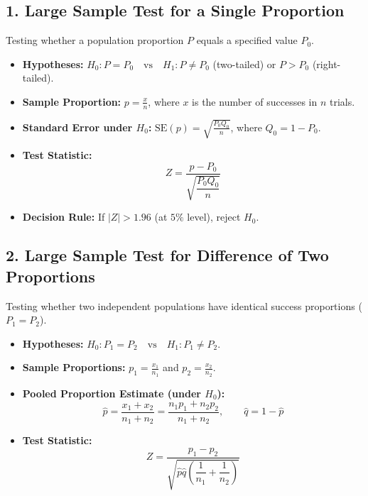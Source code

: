\documentclass[12pt,a4paper]{article}
\begin{document}
\subsection{1. Large Sample Test for a Single Proportion}
Testing whether a population proportion $P$ equals a specified value $P_0$.
\begin{tcolorbox}[formulabox, title={\textbf{Test for Single Proportion}}]
\begin{itemize}[leftmargin=*, itemsep=2pt]
  \item \textbf{Hypotheses:} $H_0: P = P_0 \quad \text{vs} \quad H_1: P \ne P_0$ (two-tailed) or $P > P_0$ (right-tailed).
  \item \textbf{Sample Proportion:} $p = \frac{x}{n}$, where $x$ is the number of successes in $n$ trials.
  \item \textbf{Standard Error under $H_0$:} $\text{SE}(p) = \sqrt{\frac{P_0 Q_0}{n}}$, where $Q_0 = 1 - P_0$.
  \item \textbf{Test Statistic:}
  \begin{equation}
    Z = \frac{p - P_0}{\sqrt{\dfrac{P_0 Q_0}{n}}}
  \end{equation}
  \item \textbf{Decision Rule:} If $|Z| > 1.96$ (at $5\%$ level), reject $H_0$.
\end{itemize}
\end{tcolorbox}

\subsection{2. Large Sample Test for Difference of Two Proportions}
Testing whether two independent populations have identical success proportions ($P_1 = P_2$).
\begin{tcolorbox}[formulabox, title={\textbf{Test for Difference of Two Proportions}}]
\begin{itemize}[leftmargin=*, itemsep=2pt]
  \item \textbf{Hypotheses:} $H_0: P_1 = P_2 \quad \text{vs} \quad H_1: P_1 \ne P_2$.
  \item \textbf{Sample Proportions:} $p_1 = \frac{x_1}{n_1}$ and $p_2 = \frac{x_2}{n_2}$.
  \item \textbf{Pooled Proportion Estimate (under $H_0$):}
  \begin{equation}
    \hat{p} = \frac{x_1 + x_2}{n_1 + n_2} = \frac{n_1 p_1 + n_2 p_2}{n_1 + n_2}, \qquad \hat{q} = 1 - \hat{p}
  \end{equation}
  \item \textbf{Test Statistic:}
  \begin{equation}
    Z = \frac{p_1 - p_2}{\sqrt{\hat{p}\hat{q}\left(\dfrac{1}{n_1} + \dfrac{1}{n_2}\right)}}
  \end{equation}
\end{itemize}
\end{tcolorbox}
\end{document}
